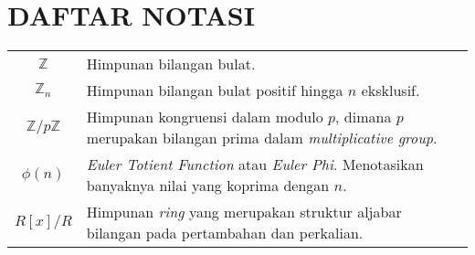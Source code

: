 \chapter{DAFTAR NOTASI}
\begin{tabularx}{\linewidth}{c X}
	$ \mathbb{Z} $ & Himpunan bilangan bulat. \\
	$ \mathbb{Z}_n $ & Himpunan bilangan bulat positif hingga $ n $ eksklusif. \\
	$ \mathbb{Z}/p\mathbb{Z} $ & Himpunan kongruensi dalam modulo $ p $, dimana $ p $ merupakan bilangan prima dalam \textit{multiplicative group}. \\
	$ \phi(n) $ & \textit{Euler Totient Function} atau \textit{Euler Phi}. Menotasikan banyaknya nilai yang koprima dengan $ n $. \\
	$ R[x]/R $ & Himpunan \textit{ring} yang merupakan struktur aljabar bilangan pada pertambahan dan perkalian.
\end{tabularx}